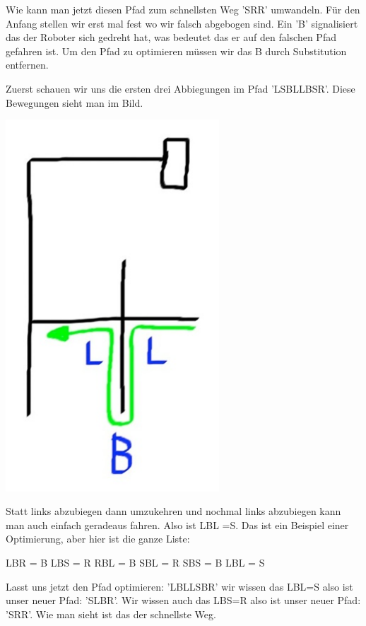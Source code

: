 \documentclass[12pt]{article}
\begin{document}
Wie kann man jetzt diesen Pfad zum schnellsten Weg 'SRR' umwandeln. Für den Anfang stellen wir erst mal fest wo wir falsch abgebogen sind. Ein 'B' signalisiert das der Roboter sich gedreht hat, was bedeutet das er auf den falschen Pfad gefahren ist. Um den Pfad zu optimieren müssen wir das B durch Substitution entfernen.

Zuerst schauen wir uns die ersten drei Abbiegungen im Pfad 'LSBLLBSR'. Diese Bewegungen sieht man im Bild.

\includegraphics[width=0.6\textwidth]{images/first_three_turns.jpg}

Statt links abzubiegen dann umzukehren und nochmal links abzubiegen kann man auch einfach geradeaus fahren. Also ist LBL =S. Das ist ein Beispiel einer Optimierung, aber hier ist die ganze Liste:\par
LBR = B \hspace{0.2cm} LBS = R \hspace{0.2cm} RBL = B \hspace{0.2cm} SBL = R \hspace{0.2cm}SBS = B \hspace{0.2cm} LBL = S

Lasst uns jetzt den Pfad optimieren: 'LBLLSBR' wir wissen das LBL=S also ist unser neuer Pfad: 'SLBR'. Wir wissen auch das LBS=R also ist unser neuer Pfad:  
'SRR'. Wie man sieht ist das der schnellste Weg.
\end{document}

